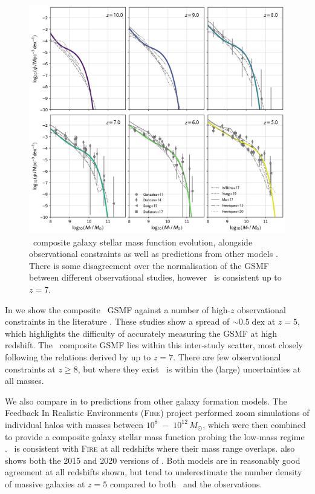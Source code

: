 \begin{figure}
	\includegraphics[width=\textwidth]{images/gsmf_multi_both.png}
    \caption{\flares\ composite galaxy stellar mass function evolution, alongside observational constraints \citep{gonzalez_evolution_2011,duncan_mass_2014,song_evolution_2016,stefanon_rest-frame_2017} as well as predictions from other models \citep{yung_semi-analytic_2019,ma_simulating_2018,henriques_galaxy_2015,henriques_l-galaxies_2020}.
    There is some disagreement over the normalisation of the GSMF between different observational studies, however \flares\ is consistent up to $z = 7$.
    }
    \label{fig:gsmf_multi_both}
\end{figure}

In  we show the composite \flares\ GSMF against a number of high-$z$ observational constraints in the literature \citep{gonzalez_evolution_2011,duncan_mass_2014,song_evolution_2016,stefanon_rest-frame_2017}.
These studies show a spread of $\sim 0.5 \; \mathrm{dex}$ at $z = 5$, which highlights the difficulty of accurately measuring the GSMF at high redshift.
The \flares\ composite GSMF lies within this inter-study scatter, most closely following the relations derived by \cite{song_evolution_2016} up to $z = 7$.
There are few observational constraints at $z \geqslant 8$, but where they exist \flares\ is within the (large) uncertainties at all masses.


We also compare in  to predictions from other galaxy formation models.
The Feedback In Realistic Environments (\textsc{Fire}) project performed zoom simulations of individual halos with masses between $10^{8} \;-\; 10^{12} \, M_{\odot}$, which were then combined to provide a composite galaxy stellar mass function probing the low-mass regime \citep{ma_simulating_2018}.
\flares\ is consistent with \textsc{Fire} at all redshifts where their mass range overlaps.
 also shows both the 2015 and 2020 versions of \lgals.
Both models are in reasonably good agreement at all redshifts shown, but tend to underestimate the number density of massive galaxies at $z=5$ compared to both \flares\ and the observations.

